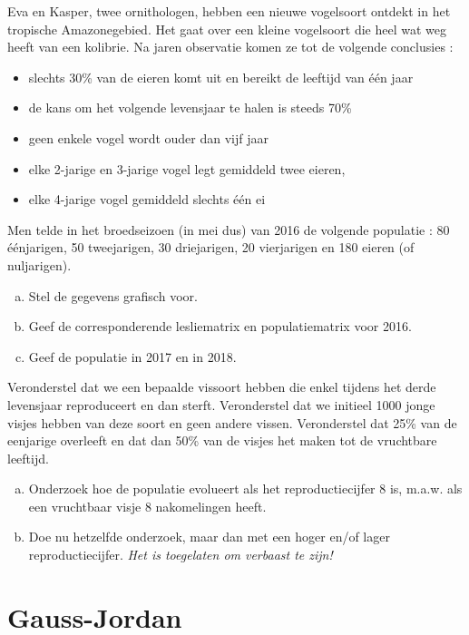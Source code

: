 \documentclass[12pt,twoside]{article}
\begin{document}
\begin{oefening}
Eva en Kasper, twee ornithologen, hebben een nieuwe vogelsoort ontdekt in het tropische Amazonegebied.  Het gaat over een kleine vogelsoort die heel wat weg heeft van een kolibrie.  Na jaren observatie komen ze tot de volgende conclusies :
\begin{itemize}
  \item slechts 30\% van de eieren komt uit en bereikt de leeftijd van één jaar
  \item de kans om het volgende levensjaar te halen is steeds 70\%
  \item geen enkele vogel wordt ouder dan vijf jaar
  \item elke 2-jarige en 3-jarige vogel legt gemiddeld twee eieren,
  \item elke 4-jarige vogel gemiddeld slechts één ei
\end{itemize}
Men telde in het broedseizoen (in mei dus) van 2016 de volgende populatie :
80 éénjarigen, 50 tweejarigen, 30 driejarigen, 20 vierjarigen en 180 eieren (of nuljarigen).

\begin{enumerate}[(a)]
  \item Stel de gegevens grafisch voor.
  \item Geef de corresponderende lesliematrix en populatiematrix voor 2016.
  \item Geef de populatie in 2017 en in 2018.
\end{enumerate}
\end{oefening}

\begin{oefening}
Veronderstel dat we een bepaalde vissoort hebben die enkel tijdens het derde levensjaar reproduceert en dan sterft. Veronderstel dat we initieel 1000 jonge visjes hebben van deze soort en geen andere vissen. Veronderstel dat 25\% van de eenjarige overleeft en dat dan 50\% van de visjes het maken tot de vruchtbare leeftijd.
\begin{enumerate}[(a)]
  \item Onderzoek hoe de populatie evolueert als het reproductiecijfer 8 is, m.a.w. als een vruchtbaar visje 8 nakomelingen heeft.
  \item Doe nu hetzelfde onderzoek, maar dan met een hoger en/of lager reproductiecijfer. {\em Het is toegelaten om verbaast te zijn!}
\end{enumerate}
\end{oefening}

\pagebreak
\section{Gauss-Jordan}
\end{document}
